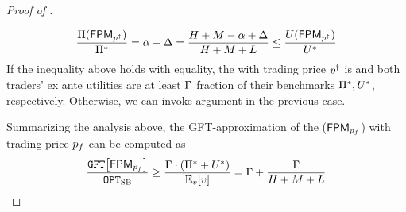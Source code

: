 \begin{proof}[Proof of ]
\begin{itemize}
        \begin{align*}
            \frac{\Pi({\sf FPM}_{p^\dagger})}{\Pi^*} = \alpha - \Delta = \frac{H + M - \alpha + \Delta}{H + M + L}
            \leq 
            \frac{U({\sf FPM}_{p^\dagger})}{U^*}
        \end{align*}
        If the inequality above holds with equality, the {\FixPrice} with trading price $p^\dagger$ is {\ksfair} and both traders' ex ante utilities are at least $\Gamma$ fraction of their benchmarks $\Pi^*,U^*$, respectively. Otherwise, we can invoke argument in the previous case.
    \end{itemize}
    Summarizing the analysis above, the GFT-approximation of the {\ksfair} {\FixPrice} (${\sf FPM}_{p_f}$) with trading price $p_f$ can be computed as 
    \begin{align*}
        \frac{\GFT{\FPM_{\fprice}}}{\OPTSB}
        \geq
        \frac{\exanteutilratio \cdot (\sellerbenchmark + \buyerbenchmark)}{\expect[\val]{\val}}
        =
        \exanteutilratio + \frac{\exanteutilratio}{H + M + L}
    \end{align*}


\end{proof}
